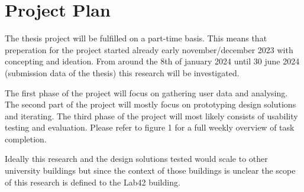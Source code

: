 \section{Project Plan}

The thesis project will be fulfilled on a part-time basis. This means that preperation for the project started already early november/december 2023 with concepting and ideation. From around the 8th of january 2024 until 30 june 2024 (submission data of the thesis) this research will be investigated.

The first phase of the project will focus on gathering user data and analysing. The second part of the project will mostly focus on prototyping design solutions and iterating. The third phase of the project will most likely consists of usability testing and evaluation. Please refer to figure 1 for a full weekly overview of task completion.

Ideally this research and the design solutions tested would scale to other university buildings but since the context of those buildings is unclear the scope of this research is defined to the Lab42 building.